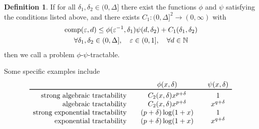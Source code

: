 \documentclass{article}
\theoremstyle{definition}
\newtheorem{definition}{Definition}
\begin{document}
\begin{definition}
If for all $\delta_1, \delta_2 \in (0,\Delta]$ there exist the functions $\phi$ and $\psi$ satisfying the conditions listed above, and there exists $C_1 : (0,\Delta]^2 \to (0,\infty)$  with 
\begin{multline*}
    \operatorname{comp}(\varepsilon, d) \le \phi(\varepsilon^{-1},\delta_1)\psi(d,\delta_2) + C_1(\delta_1, \delta_2) \\
    \forall \delta_1, \delta_2 \in (0,\Delta], \quad  \varepsilon \in (0, 1], \quad \forall d \in \mathbb{N}
\end{multline*}
then we call a problem $\phi$-$\psi$-tractable.
\end{definition}

Some specific examples include 
\begin{equation*}
    \begin{array}{r@{\qquad}c@{\qquad}c}
    & \phi(x,\delta) & \psi(x,\delta) \\
    \toprule
    \text{strong algebraic tractability} & C_2(x,\delta) x^{p+\delta} & 1\\
    \text{ algebraic tractability} & C_2(x,\delta) x^{p+\delta} & x^{q+\delta}\\
    \text{strong exponential tractability} &(p+\delta) \log(1 + x) & 1 \\
    \text{ exponential tractability} &(p+\delta) \log(1 + x) &  x^{q+\delta} \\
    & 
    \end{array}
\end{equation*}
\end{document}
